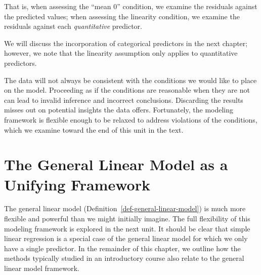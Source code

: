 \documentclass[
  letterpaper,
  DIV=11,
  numbers=noendperiod]{scrreprt}
\theoremstyle{definition}
\theoremstyle{definition}
\theoremstyle{remark}
\begin{document}
That is, when assessing the ``mean 0'' condition, we examine the
residuals against the predicted values; when assessing the linearity
condition, we examine the residuals against each \emph{quantitative}
predictor.

\begin{tcolorbox}[enhanced jigsaw, bottomrule=.15mm, titlerule=0mm, bottomtitle=1mm, colback=white, coltitle=black, rightrule=.15mm, leftrule=.75mm, toprule=.15mm, toptitle=1mm, left=2mm, opacityback=0, colframe=quarto-callout-note-color-frame, breakable, title=\textcolor{quarto-callout-note-color}{\faInfo}\hspace{0.5em}{Note}, arc=.35mm, colbacktitle=quarto-callout-note-color!10!white, opacitybacktitle=0.6]

We will discuss the incorporation of categorical predictors in the next
chapter; however, we note that the linearity assumption only applies to
quantitative predictors.

\end{tcolorbox}

The data will not always be consistent with the conditions we would like
to place on the model. Proceeding as if the conditions are reasonable
when they are not can lead to invalid inference and incorrect
conclusions. Discarding the results misses out on potential insights the
data offers. Fortunately, the modeling framework is flexible enough to
be relaxed to address violations of the conditions, which we examine
toward the end of this unit in the text.

\hypertarget{sec-glm-unifying-framework}{%
\chapter{The General Linear Model as a Unifying
Framework}\label{sec-glm-unifying-framework}}

\providecommand{\norm}[1]{\lVert#1\rVert}
\providecommand{\abs}[1]{\lvert#1\rvert}
\providecommand{\dist}[1]{\stackrel{\text{#1}}{\sim}}
\providecommand{\ind}[1]{\mathbb{I}\left(#1\right)}
\providecommand{\bm}[1]{\mathbf{#1}}
\providecommand{\bs}[1]{\boldsymbol{#1}}
\providecommand{\Ell}{\mathcal{L}}
\providecommand{\indep}{\perp\negthickspace\negmedspace\perp}

The general linear model (Definition~\ref{def-general-linear-model}) is
much more flexible and powerful than we might initially imagine. The
full flexibility of this modeling framework is explored in the next
unit. It should be clear that simple linear regression is a special case
of the general linear model for which we only have a single predictor.
In the remainder of this chapter, we outline how the methods typically
studied in an introductory course also relate to the general linear
model framework.
\end{document}

